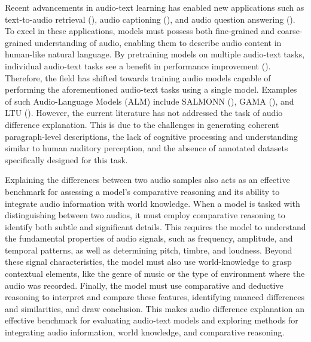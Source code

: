Recent advancements in audio-text learning has enabled new applications such as text-to-audio retrieval (\cite{koepke2022audio, deshmukh23_interspeech}), audio captioning (\cite{mei2022automated, noaudiocap}), and audio question answering (\cite{clothoaqa, ltu}). To excel in these applications, models must possess both fine-grained and coarse-grained understanding of audio, enabling them to describe audio content in human-like natural language. By pretraining models on multiple audio-text tasks, individual audio-text tasks see a benefit in performance improvement (\cite{mspengi}). Therefore, the field has shifted towards training audio models capable of performing the aforementioned audio-text tasks using a single model. Examples of such Audio-Language Models (ALM) include SALMONN (\cite{salmonn}), GAMA (\cite{ghosh2024gama}), and LTU (\cite{ltu, ltuas}). However, the current literature has not addressed the task of audio difference explanation. This is due to the challenges in generating coherent paragraph-level descriptions, the lack of cognitive processing and understanding similar to human auditory perception, and the absence of annotated datasets specifically designed for this task. 

Explaining the differences between two audio samples also acts as an effective benchmark for assessing a model’s comparative reasoning and its ability to integrate audio information with world knowledge. When a model is tasked with distinguishing between two audios, it must employ comparative reasoning to identify both subtle and significant details. This requires the model to understand the fundamental properties of audio signals, such as frequency, amplitude, and temporal patterns, as well as determining pitch, timbre, and loudness. Beyond these signal characteristics, the model must also use world-knowledge to grasp contextual elements, like the genre of music or the type of environment where the audio was recorded. Finally, the model must use comparative and deductive reasoning to interpret and compare these features, identifying nuanced differences and similarities, and draw conclusion. This makes audio difference explanation an effective benchmark for evaluating audio-text models and exploring methods for integrating audio information, world knowledge, and comparative reasoning. 

